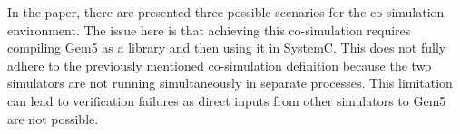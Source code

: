 In the paper, there are presented three possible scenarios for the co-simulation environment. The issue here is that achieving 
this co-simulation requires compiling Gem5 as a library and then using it in SystemC. This does not fully adhere to the previously mentioned 
co-simulation definition because the two simulators are not running simultaneously in separate processes. This limitation can lead to 
verification failures as direct inputs from other simulators to Gem5 are not possible.

